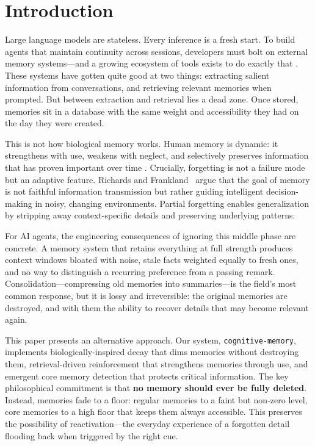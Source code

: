 \documentclass[11pt,a4paper]{article}
\begin{document}
\section{Introduction}

Large language models are stateless. Every inference is a fresh start. To build agents that maintain continuity across sessions, developers must bolt on external memory systems---and a growing ecosystem of tools exists to do exactly that \citep{chhikara2024mem0, packer2023memgpt, sumers2024coala}. These systems have gotten quite good at two things: extracting salient information from conversations, and retrieving relevant memories when prompted. But between extraction and retrieval lies a dead zone. Once stored, memories sit in a database with the same weight and accessibility they had on the day they were created.

This is not how biological memory works. Human memory is dynamic: it strengthens with use, weakens with neglect, and selectively preserves information that has proven important over time \citep{ebbinghaus1885, bjork1992new}. Crucially, forgetting is not a failure mode but an adaptive feature. Richards and Frankland~\citeyearpar{richards2017persistence} argue that the goal of memory is not faithful information transmission but rather guiding intelligent decision-making in noisy, changing environments. Partial forgetting enables generalization by stripping away context-specific details and preserving underlying patterns.

For AI agents, the engineering consequences of ignoring this middle phase are concrete. A memory system that retains everything at full strength produces context windows bloated with noise, stale facts weighted equally to fresh ones, and no way to distinguish a recurring preference from a passing remark. Consolidation---compressing old memories into summaries---is the field's most common response, but it is lossy and irreversible: the original memories are destroyed, and with them the ability to recover details that may become relevant again.

This paper presents an alternative approach. Our system, \texttt{cognitive-memory}, implements biologically-inspired decay that dims memories without destroying them, retrieval-driven reinforcement that strengthens memories through use, and emergent core memory detection that protects critical information. The key philosophical commitment is that \textbf{no memory should ever be fully deleted}. Instead, memories fade to a floor: regular memories to a faint but non-zero level, core memories to a high floor that keeps them always accessible. This preserves the possibility of reactivation---the everyday experience of a forgotten detail flooding back when triggered by the right cue.
\end{document}
